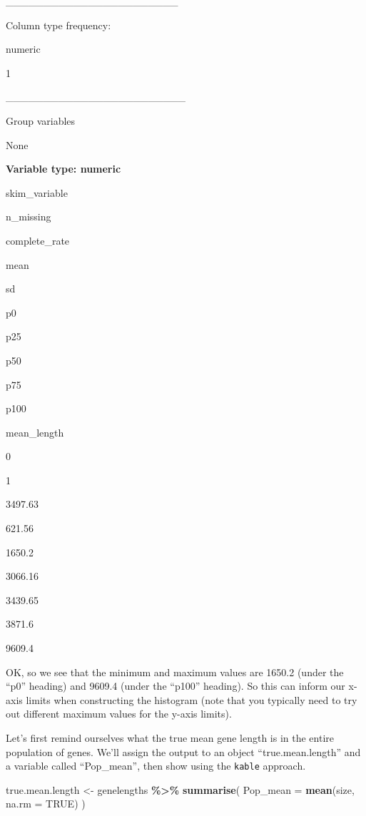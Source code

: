 \documentclass[
]{book}
\newenvironment{Shaded}{\begin{snugshade}}{\end{snugshade}}
\newcommand{\AttributeTok}[1]{\textcolor[rgb]{0.13,0.29,0.53}{#1}}
\newcommand{\ConstantTok}[1]{\textcolor[rgb]{0.56,0.35,0.01}{#1}}
\newcommand{\FunctionTok}[1]{\textcolor[rgb]{0.13,0.29,0.53}{\textbf{#1}}}
\newcommand{\NormalTok}[1]{#1}
\newcommand{\OtherTok}[1]{\textcolor[rgb]{0.56,0.35,0.01}{#1}}
\newcommand{\SpecialCharTok}[1]{\textcolor[rgb]{0.81,0.36,0.00}{\textbf{#1}}}
\begin{document}
\_\_\_\_\_\_\_\_\_\_\_\_\_\_\_\_\_\_\_\_\_\_\_

Column type frequency:

numeric

1

\_\_\_\_\_\_\_\_\_\_\_\_\_\_\_\_\_\_\_\_\_\_\_\_

Group variables

None

\textbf{Variable type: numeric}

skim\_variable

n\_missing

complete\_rate

mean

sd

p0

p25

p50

p75

p100

mean\_length

0

1

3497.63

621.56

1650.2

3066.16

3439.65

3871.6

9609.4

OK, so we see that the minimum and maximum values are 1650.2 (under the ``p0'' heading) and 9609.4 (under the ``p100'' heading). So this can inform our x-axis limits when constructing the histogram (note that you typically need to try out different maximum values for the y-axis limits).

Let's first remind ourselves what the true mean gene length is in the entire population of genes. We'll assign the output to an object ``true.mean.length'' and a variable called ``Pop\_mean'', then show using the \texttt{kable} approach.

\begin{Shaded}
\begin{Highlighting}[]
\NormalTok{true.mean.length }\OtherTok{\textless{}{-}}\NormalTok{ genelengths }\SpecialCharTok{\%\textgreater{}\%}
  \FunctionTok{summarise}\NormalTok{(}
    \AttributeTok{Pop\_mean =} \FunctionTok{mean}\NormalTok{(size, }\AttributeTok{na.rm =} \ConstantTok{TRUE}\NormalTok{)}
\NormalTok{  )}
\end{Highlighting}
\end{Shaded}
\end{document}
